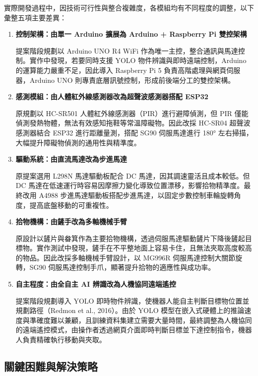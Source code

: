 \documentclass[12pt]{article}
\begin{document}
實際開發過程中，因技術可行性與整合複雜度，各模組均有不同程度的調整，以下彙整五項主要差異：

\begin{enumerate}
  \setlength{\itemsep}{0.6em}

  \item \textbf{控制架構：由單一 Arduino 擴展為 Arduino + Raspberry Pi 雙控架構}

  提案階段規劃以 Arduino UNO R4 WiFi 作為唯一主控，整合通訊與馬達控制。實作中發現，若要同時支援 YOLO 物件辨識與即時遠端控制，Arduino 的運算能力嚴重不足，因此導入 Raspberry Pi 5 負責高階處理與網頁伺服器，Arduino UNO 則專責底層訊號控制，形成前後端分工的雙控架構。

  \item \textbf{感測模組：由人體紅外線感測器改為超聲波感測器搭配 ESP32}

  原規劃以 HC-SR501 人體紅外線感測器（PIR）進行避障偵測，但 PIR 僅能偵測發熱物體，無法有效感知拖鞋等常溫障礙物。因此改採 HC-SR04 超聲波感測器結合 ESP32 進行距離量測，搭配 SG90 伺服馬達進行 180° 左右掃描，大幅提升障礙物偵測的通用性與精準度。

  \item \textbf{驅動系統：由直流馬達改為步進馬達}

  原提案選用 L298N 馬達驅動板配合 DC 馬達，因其調速靈活且成本較低。但 DC 馬達在低速運行時容易因摩擦力變化導致位置漂移，影響拾物精準度。最終改用 A4988 步進馬達驅動板搭配步進馬達，以固定步數控制車輪旋轉角度，提高底盤移動的可重複性。

  \item \textbf{拾物機構：由鏟手改為多軸機械手臂}

  原設計以鏟片與畚箕作為主要拾物機構，透過伺服馬達驅動鏟片下降後鏟起目標物。實作測試中發現，鏟手在不平整地面上容易卡住，且無法夾取高度較高的物品。因此改採多軸機械手臂設計，以 MG996R 伺服馬達控制大關節旋轉，SG90 伺服馬達控制手爪，顯著提升拾物的適應性與成功率。

  \item \textbf{自主程度：由全自主 AI 辨識改為人機協同遠端遙控}

  提案階段規劃導入 YOLO 即時物件辨識，使機器人能自主判斷目標物位置並規劃路徑（Redmon et al., 2016）。由於 YOLO 模型在嵌入式硬體上的推論速度與準確度難以兼顧，且訓練資料集建立需要大量時間，最終調整為人機協同的遠端遙控模式，由操作者透過網頁介面即時判斷目標並下達控制指令，機器人負責精確執行移動與夾取。

\end{enumerate}

\subsection{關鍵困難與解決策略}
\end{document}

